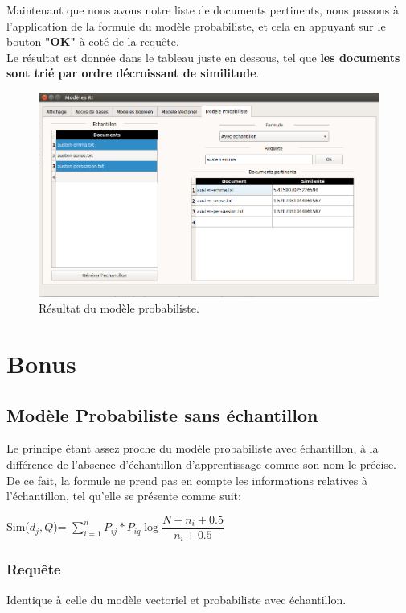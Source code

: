 \documentclass[12pt,a4paper,oneside]{article}
\begin{document}
Maintenant que nous avons notre liste de documents pertinents, nous passons à l'application de la formule du modèle probabiliste, et cela en appuyant sur le bouton \textbf{"OK"} à coté de la requête.\\

Le résultat est donnée dans le tableau juste en dessous, tel que \textbf{les documents sont trié par ordre décroissant de similitude}.
	\begin{figure}[H]
		\centering
		\includegraphics[scale=0.4]{images/modeleP2.png}
		\caption{Résultat du modèle probabiliste.}
	\end{figure}

\newpage 

\section{Bonus}

\subsection{Modèle Probabiliste sans échantillon}
Le principe étant assez proche du modèle probabiliste avec échantillon, à la différence de l'absence d'échantillon d'apprentissage comme son nom le précise.\\

De ce fait, la formule ne prend pas en compte les informations relatives à l'échantillon, tel qu'elle se présente comme suit:
\begin{center}
	Sim($d_{j},Q$)= $\sum_{i=1}^{n} P_{ij} * P_{iq} \log \dfrac{N-n_{i}+0.5}{n_{i}+0.5}$
\end{center}

\subsubsection*{Requête}
Identique à celle du modèle vectoriel et probabiliste avec échantillon.
\end{document}

